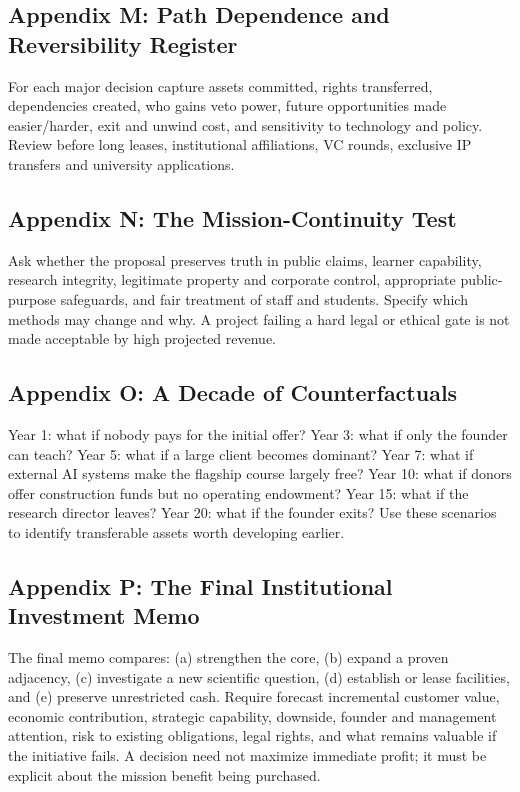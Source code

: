 \subsection{Appendix M: Path Dependence and Reversibility Register}

For each major decision capture assets committed, rights transferred, dependencies created, who gains veto power, future opportunities made easier/\allowbreak harder, exit and unwind cost, and sensitivity to technology and policy. Review before long leases, institutional affiliations, VC rounds, exclusive IP transfers and university applications.

\subsection{Appendix N: The Mission-Continuity Test}

Ask whether the proposal preserves truth in public claims, learner capability, research integrity, legitimate property and corporate control, appropriate public-purpose safeguards, and fair treatment of staff and students. Specify which methods may change and why. A project failing a hard legal or ethical gate is not made acceptable by high projected revenue.

\subsection{Appendix O: A Decade of Counterfactuals}

Year 1: what if nobody pays for the initial offer? Year 3: what if only the founder can teach? Year 5: what if a large client becomes dominant? Year 7: what if external AI systems make the flagship course largely free? Year 10: what if donors offer construction funds but no operating endowment? Year 15: what if the research director leaves? Year 20: what if the founder exits? Use these scenarios to identify transferable assets worth developing earlier.

\subsection{Appendix P: The Final Institutional Investment Memo}

The final memo compares: (a) strengthen the core, (b) expand a proven adjacency, (c) investigate a new scientific question, (d) establish or lease facilities, and (e) preserve unrestricted cash. Require forecast incremental customer value, economic contribution, strategic capability, downside, founder and management attention, risk to existing obligations, legal rights, and what remains valuable if the initiative fails. A decision need not maximize immediate profit; it must be explicit about the mission benefit being purchased.

